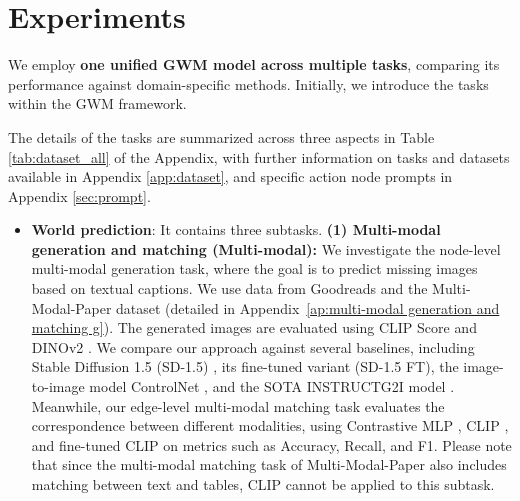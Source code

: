 \section{Experiments} \label{sec:exps}

We employ \textbf{one unified GWM model across multiple tasks}, comparing its performance against domain-specific methods. Initially, we introduce the tasks within the GWM framework.

The details of the tasks are summarized across three aspects in Table \ref{tab:dataset_all} of the Appendix, with further information on tasks and datasets available in Appendix \ref{app:dataset}, and specific action node prompts in Appendix \ref{sec:prompt}.

\begin{itemize}[leftmargin=1em, itemsep=0pt]

\item \textbf{World prediction}: It contains three subtasks. \textbf{(1) Multi-modal generation and matching (Multi-modal):} We investigate the node-level multi-modal generation task, where the goal is to predict missing images based on textual captions. We use data from Goodreads \citep{jin2024instructg2i} and the Multi-Modal-Paper dataset (detailed in Appendix~\ref{ap:multi-modal generation and matching g}). The generated images are evaluated using CLIP Score \citep{radford2021learning} and DINOv2 \citep{oquab2023dinov2}. We compare our approach against several baselines, including Stable Diffusion 1.5 (SD-1.5) \citep{rombach2022high}, its fine-tuned variant (SD-1.5 FT), the image-to-image model ControlNet \citep{zhang2023adding}, and the SOTA INSTRUCTG2I model \citep{jin2024instructg2i}. Meanwhile, our edge-level multi-modal matching task evaluates the correspondence between different modalities, using Contrastive MLP \citep{liu2022mlp}, CLIP \citep{radford2021learning}, and fine-tuned CLIP on metrics such as Accuracy, Recall, and F1. %
Please note that since the multi-modal matching task of Multi-Modal-Paper also includes matching between text and tables, CLIP cannot be applied to this subtask.   


\end{itemize}
